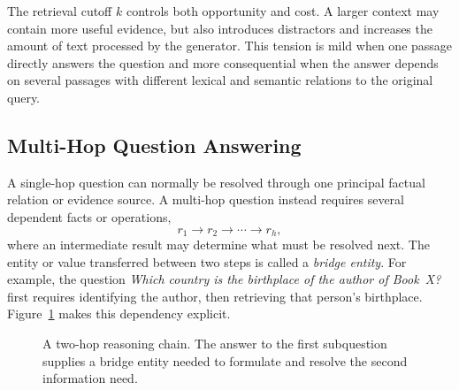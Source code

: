 The retrieval cutoff \(k\) controls both opportunity and cost. A larger context
may contain more useful evidence, but also introduces distractors and increases
the amount of text processed by the generator. This tension is mild when one
passage directly answers the question and more consequential when the answer
depends on several passages with different lexical and semantic relations to the
original query.

\subsection{Multi-Hop Question Answering}
\label{subsec:multihop-qa}

A single-hop question can normally be resolved through one principal factual
relation or evidence source. A multi-hop question instead requires several
dependent facts or operations,
\begin{equation}
  r_1 \longrightarrow r_2 \longrightarrow \cdots \longrightarrow r_h,
  \label{eq:reasoning-chain}
\end{equation}
where an intermediate result may determine what must be resolved next. The
entity or value transferred between two steps is called a \emph{bridge entity}.
For example, the question \emph{Which country is the birthplace of the author of
Book~X?} first requires identifying the author, then retrieving that person's
birthplace. Figure~\ref{fig:multihop-chain} makes this dependency explicit.

\begin{figure}[htbp]
  \centering
  \caption[Multi-hop reasoning through a bridge entity]{A two-hop reasoning
    chain. The answer to the first subquestion supplies a bridge entity needed
    to formulate and resolve the second information need.}
  \label{fig:multihop-chain}
\end{figure}

